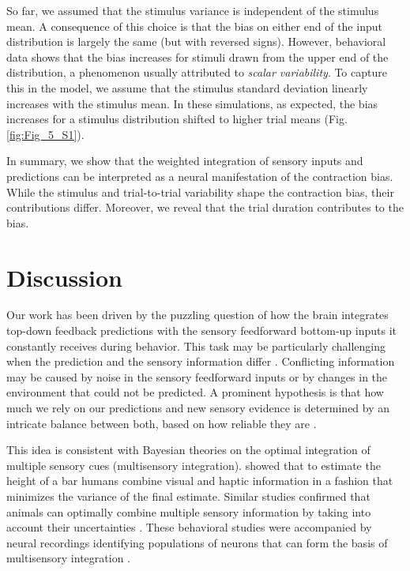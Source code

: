 \documentclass[10pt,a4paper]{article}
\begin{document}
So far, we assumed that the stimulus variance is independent of the stimulus mean. A consequence of this choice is that the bias on either end of the input distribution is largely the same (but with reversed signs). However, behavioral data \citep[see, e.g.][]{rakitin1998scalar} shows that the bias increases for stimuli drawn from the upper end of the distribution, a phenomenon usually attributed to \textit{scalar variability}. To capture this in the model, we assume that the stimulus standard deviation linearly increases with the stimulus mean. In these simulations, as expected, the bias increases for a stimulus distribution shifted to higher trial means (Fig. \ref{fig:Fig_5_S1}).

In summary, we show that the weighted integration of sensory inputs and predictions can be interpreted as a neural manifestation of the contraction bias. While the stimulus and trial-to-trial variability shape the contraction bias, their contributions differ. Moreover, we reveal that the trial duration contributes to the bias.


\section*{Discussion}
%
Our work has been driven by the puzzling question of how the brain integrates top-down feedback predictions with the sensory feedforward bottom-up inputs it constantly receives during behavior. This task may be particularly challenging when the prediction and the sensory information differ \citep{han2023behavior}. Conflicting information may be caused by noise in the sensory feedforward inputs or by changes in the environment that could not be predicted. A prominent hypothesis is that how much we rely on our predictions and new sensory evidence is determined by an intricate balance between both, based on how reliable they are \citep[see e.g.][]{kording2004bayesian, yon2021precision}. 

This idea is consistent with Bayesian theories on the optimal integration of multiple sensory cues (multisensory integration). \cite{ernst2002humans} showed that to estimate the height of a bar humans combine visual and haptic information in a fashion that minimizes the variance of the final estimate. Similar studies confirmed that animals can optimally combine multiple sensory information by taking into account their uncertainties \citep{battaglia2003bayesian, kording2004bayesian, alais2004ventriloquist, rowland2007bayesian, gu2008neural, fetsch2012neural}. These behavioral studies were accompanied by neural recordings identifying populations of neurons that can form the basis of multisensory integration \citep{wallace1998multisensory, gu2008neural, fetsch2012neural}.
\end{document}
